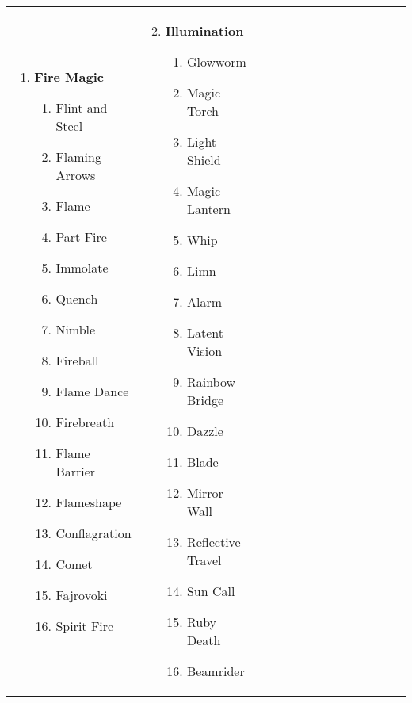 \renewcommand{\labelenumii}{\arabic{enumii}.}
\begin{tabular}{@{} p{0.25\linewidth} p{0.25\linewidth} p{0.25\linewidth} p{0.25\linewidth}}
\begin{enumerate}
	\item \textbf{Fire Magic}
	\begin{enumerate}
		\item Flint and Steel
		\item Flaming Arrows
		\item Flame
		\item Part Fire
		\item Immolate
		\item Quench
		\item Nimble
		\item Fireball
		\item Flame Dance
		\item Firebreath
		\item Flame Barrier
		\item Flameshape
		\item Conflagration
		\item Comet
		\item Fajrovoki
		\item Spirit Fire
	\end{enumerate}
\end{enumerate} &
\begin{enumerate}
	\setcounter{enumi}{1}
	\item \textbf{Illumination}
	\begin{enumerate}
		\item Glowworm
		\item Magic Torch
		\item Light Shield
		\item Magic Lantern
		\item Whip
		\item Limn
		\item Alarm
		\item Latent Vision
		\item Rainbow Bridge
		\item Dazzle
		\item Blade
		\item Mirror Wall
		\item Reflective Travel
		\item Sun Call
		\item Ruby Death
		\item Beamrider
	\end{enumerate}

\end{enumerate}
\end{tabular}
